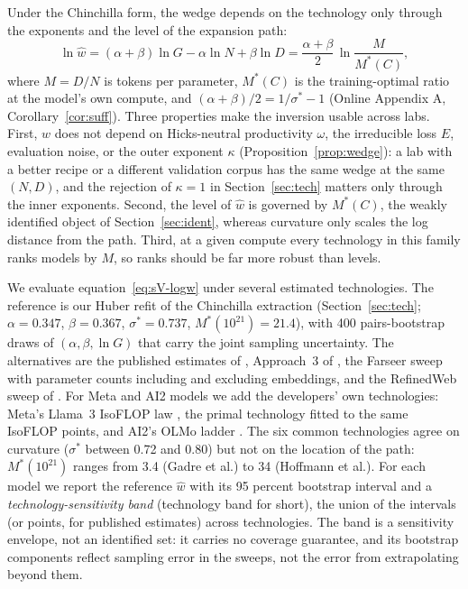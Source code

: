 Under the Chinchilla form, the wedge depends on the technology only through the exponents and the level of the
expansion path:
\begin{equation}\label{eq:sV-logw}
\ln\hat w=(\alpha+\beta)\ln G-\alpha\ln N+\beta\ln D=\frac{\alpha+\beta}{2}\,\ln\frac{M}{M^*(C)},
\end{equation}
where $M=D/N$ is tokens per parameter, $M^*(C)$ is the training-optimal ratio at the model's own compute, and
$(\alpha+\beta)/2=1/\sigma^*-1$ (Online Appendix A, Corollary~\ref{cor:suff}). Three properties make the inversion
usable across labs. First, $w$ does not depend on Hicks-neutral productivity $\omega$, the irreducible loss $E$,
evaluation noise, or the outer exponent $\kappa$ (Proposition~\ref{prop:wedge}): a lab with a better recipe or a
different validation corpus has the same wedge at the same $(N,D)$, and the rejection of $\kappa=1$ in
Section~\ref{sec:tech} matters only through the inner exponents. Second, the level of $\hat w$ is governed by $M^*(C)$, the weakly
identified object of Section~\ref{sec:ident}, whereas curvature only scales the log distance from the path. Third, at a
given compute every technology in this family ranks models by $M$, so ranks should be far more robust than levels.

We evaluate equation~\eqref{eq:sV-logw} under several estimated technologies. The reference is our Huber refit of the
Chinchilla extraction (Section~\ref{sec:tech}; $\alpha=0.347$, $\beta=0.367$, $\sigma^*=0.737$, $M^*(10^{21})=21.4$),
with 400 pairs-bootstrap draws of $(\alpha,\beta,\ln G)$ that carry the joint sampling uncertainty. The alternatives are
the published estimates of \citet{besiroglu2024chinchilla}, Approach~3 of \citet{hoffmann2022training}, the Farseer
sweep \citep{li2025predictableb} with parameter counts including and excluding embeddings, and the RefinedWeb sweep of
\citet{gadre2024language}. For Meta and AI2 models we add the developers' own technologies: Meta's Llama~3 IsoFLOP law
\citep{grattafiori2024llama}, the primal technology fitted to the same IsoFLOP points, and AI2's OLMo ladder
\citep{bhagia2024establishing}. The six common technologies agree on curvature ($\sigma^*$ between 0.72 and 0.80) but
not on the location of the path: $M^*(10^{21})$ ranges from 3.4 (Gadre et al.) to 34 (Hoffmann et al.). For each model
we report the reference $\hat w$ with its 95 percent bootstrap interval and a \emph{technology-sensitivity band} (technology band for short), the union of the
intervals (or points, for published estimates) across technologies. The band is a sensitivity envelope, not an
identified set: it carries no coverage guarantee, and its bootstrap components reflect sampling error in the sweeps, not
the error from extrapolating beyond them.

